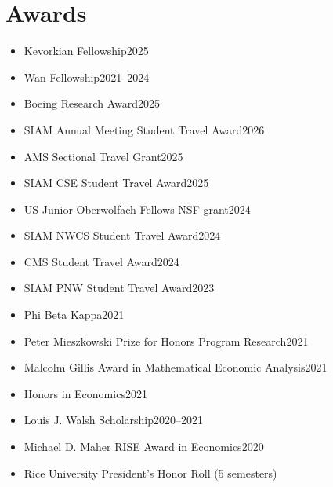 \documentclass{cv_style}
\begin{document}
	\section{Awards}
		\begin{itemize}
			\item Kevorkian Fellowship\hfill 2025
			\item Wan Fellowship\hfill2021--2024
			\item Boeing Research Award\hfill 2025
			\item SIAM Annual Meeting Student Travel Award\hfill 2026
			\item AMS Sectional Travel Grant\hfill 2025
			\item SIAM CSE Student Travel Award\hfill 2025
			\item US Junior Oberwolfach Fellows NSF grant\hfill 2024
			\item SIAM NWCS Student Travel Award\hfill 2024
			\item CMS Student Travel Award\hfill 2024
			\item SIAM PNW Student Travel Award\hfill 2023
			\item Phi Beta Kappa\hfill2021
			\item Peter Mieszkowski Prize for Honors Program Research\hfill2021
			\item Malcolm Gillis Award in Mathematical Economic Analysis\hfill2021
			\item Honors in Economics\hfill2021
			\item Louis J. Walsh Scholarship\hfill2020--2021
			\item Michael D. Maher RISE Award in Economics\hfill2020
			\item Rice University President's Honor Roll (5 semesters)
		\end{itemize}
\end{document}
